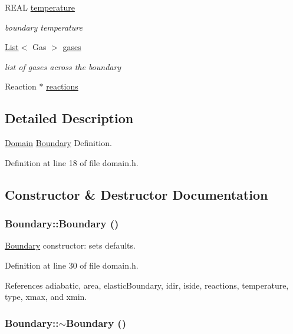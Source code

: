 \begin{CompactItemize}
REAL \hyperlink{structBoundary_74b059e4119e1739800fa93615f74ac2}{temperature}
\begin{CompactList}\small\item\em boundary temperature \item\end{CompactList}\item 
\hyperlink{classList}{List}$<$ Gas $>$ \hyperlink{structBoundary_692b67a420d6ddbf657e642f295ae580}{gases}
\begin{CompactList}\small\item\em list of gases across the boundary \item\end{CompactList}\item 
Reaction $\ast$ \hyperlink{structBoundary_b681ca73b68c662547f29ab64ee245e3}{reactions}
\end{CompactItemize}


\subsection{Detailed Description}
\hyperlink{classDomain}{Domain} \hyperlink{structBoundary}{Boundary} Definition. 

Definition at line 18 of file domain.h.

\subsection{Constructor \& Destructor Documentation}
\hypertarget{structBoundary_7c4c8db45b13dab630e4c6ed7a958e71}{
\subsubsection[{Boundary}]{\setlength{\rightskip}{0pt plus 5cm}Boundary::Boundary ()}}
\label{structBoundary_7c4c8db45b13dab630e4c6ed7a958e71}


\hyperlink{structBoundary}{Boundary} constructor: sets defaults. 



Definition at line 30 of file domain.h.

References adiabatic, area, elasticBoundary, idir, iside, reactions, temperature, type, xmax, and xmin.\hypertarget{structBoundary_86eab4f2362618c5b1e3d0df3a5f7f42}{
\subsubsection[{$\sim$Boundary}]{\setlength{\rightskip}{0pt plus 5cm}Boundary::$\sim$Boundary ()}}
\label{structBoundary_86eab4f2362618c5b1e3d0df3a5f7f42}


